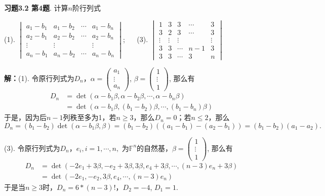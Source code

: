 
\renewcommand{\newpageorvspace}{\vspace{2em}}

\date{2021-10-29  第三次习题课}



\maketitle

{\bf 习题3.2 第4题}. 计算$n$阶行列式

(1). $\begin{vmatrix} a_1-b_1 & a_1-b_2 & \cdots & a_1-b_n \\ a_2-b_1 & a_2-b_2 & \cdots & a_2-b_n \\ \vdots & \vdots & & \vdots \\ a_n-b_1 & a_n-b_2 & \cdots & a_n-b_n \end{vmatrix}$; $\quad$ (3). $\begin{vmatrix} 1 & 3 & 3 & \cdots & 3 \\ 3 & 2 & 3 & \cdots & 3 \\ \vdots & \vdots & \vdots & & \vdots \\ 3 & 3 & \cdots & n-1 & 3 \\ 3 & 3 & \cdots & 3 & n \end{vmatrix}$

{\bf 解：}(1). 令原行列式为$D_n$，$\alpha = \begin{pmatrix} a_1 \\ \vdots \\ a_n \end{pmatrix}$, $\beta = \begin{pmatrix} 1 \\ \vdots \\ 1 \end{pmatrix}$, 那么有
\begin{align*}
D_n & = \det (\alpha-b_1\beta, \alpha-b_2\beta, \cdots, \alpha-b_n\beta) \\
& = \det (\alpha-b_1\beta, (b_1-b_2)\beta, \cdots, (b_1-b_n)\beta)
\end{align*}
于是，因为后$n-1$列秩至多为1，若$n \geqslant 3$，那么$D_n = 0$；若$n \leqslant 2$，那么
$$D_n = (b_1-b_2) \det (\alpha-b_1\beta, \beta) = (b_1-b_2)((a_1-b_1)-(a_2-b_1)) = (b_1-b_2)(a_1-a_2).$$

(3). 令原行列式为$D_n$，$e_i, i=1,\cdots,n,$ 为$\mathbb{F}^n$的自然基，$\beta = \begin{pmatrix} 1 \\ \vdots \\ 1 \end{pmatrix}$, 那么有
\begin{align*}
D_n & = \det (-2e_1+3\beta, -e_2+3\beta, 3\beta, e_4+3\beta, \cdots, (n-3)e_n+3\beta) \\
& = \det (-2e_1, -e_2, 3\beta, e_4, \cdots, (n-3)e_n)
\end{align*}
于是当$n \geqslant 3$时，$D_n = 6*(n-3)!$，$D_2 = -4$, $D_1 = 1$.

